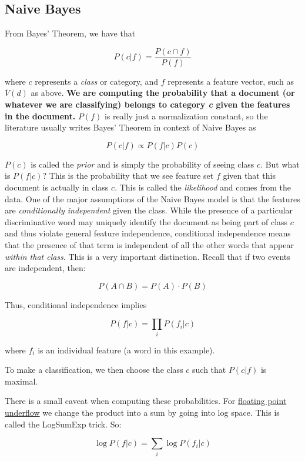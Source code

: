 \documentclass[11pt]{article}
\begin{document}
    \subsection{Naive Bayes}\label{naive-bayes}

    From Bayes' Theorem, we have that

\[P(c \vert f) = \frac{P(c \cap f)}{P(f)}\]

where \(c\) represents a \emph{class} or category, and \(f\) represents
a feature vector, such as \(\bar V(d)\) as above. \textbf{We are
computing the probability that a document (or whatever we are
classifying) belongs to category \emph{c} given the features in the
document.} \(P(f)\) is really just a normalization constant, so the
literature usually writes Bayes' Theorem in context of Naive Bayes as

\[P(c \vert f) \propto P(f \vert c) P(c) \]

\(P(c)\) is called the \emph{prior} and is simply the probability of
seeing class \(c\). But what is \(P(f \vert c)\)? This is the
probability that we see feature set \(f\) given that this document is
actually in class \(c\). This is called the \emph{likelihood} and comes
from the data. One of the major assumptions of the Naive Bayes model is
that the features are \emph{conditionally independent} given the class.
While the presence of a particular discriminative word may uniquely
identify the document as being part of class \(c\) and thus violate
general feature independence, conditional independence means that the
presence of that term is independent of all the other words that appear
\emph{within that class}. This is a very important distinction. Recall
that if two events are independent, then:

\[P(A \cap B) = P(A) \cdot P(B)\]

Thus, conditional independence implies

\[P(f \vert c)  = \prod_i P(f_i | c) \]

where \(f_i\) is an individual feature (a word in this example).

To make a classification, we then choose the class \(c\) such that
\(P(c \vert f)\) is maximal.

There is a small caveat when computing these probabilities. For
\href{http://nlp.stanford.edu/IR-book/html/htmledition/naive-bayes-text-classification-1.html}{floating
point underflow} we change the product into a sum by going into log
space. This is called the LogSumExp trick. So:

\[\log P(f \vert c)  = \sum_i \log P(f_i \vert c) \]
\end{document}
